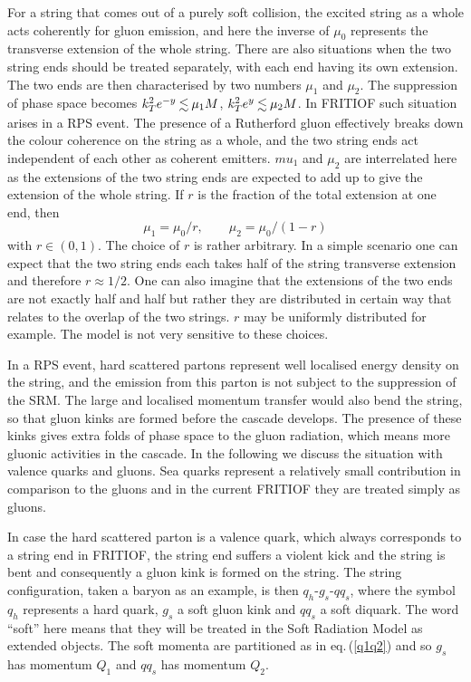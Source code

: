 For a string that comes out of a purely soft
collision, the excited string as a whole acts coherently for
gluon emission, and here the inverse of $\mu_0$ represents the transverse 
extension of the whole string.  There are also situations when the two
string ends should be treated separately, with each end having its own
extension.   The two ends are then 
characterised by two numbers $\mu_1$ and $\mu_2$.  The suppression of
phase space becomes $k^2_Te^{-y}\lsim \mu_1 M$, $k^2_Te^{y}\lsim \mu_2 M$.
In FRITIOF such situation arises in a RPS event.  The presence of a Rutherford
gluon effectively breaks down the colour coherence on the string as a whole, 
and the two string ends act independent of each other as coherent emitters.
$mu_1$ and $\mu_2$ are interrelated here as the extensions of the two string
ends are expected to add up to give the extension of the whole string.
If $r$ is the fraction of the total extension at one end, then 
\begin{equation}
\label{mu12}
\mu_1 = \mu_0/r ,  \qquad \mu_2 = \mu_0/(1-r) 
\end{equation}
with $r \in (0,1)$.  
The choice of $r$ is rather arbitrary.  
In a simple scenario one can expect that the two string ends each takes half
of the string transverse extension and therefore $r\approx 1/2$.
One can also imagine that the extensions of the two ends are not exactly
half and half but rather they are distributed in certain way that relates
to the overlap of the two strings.  $r$ may be uniformly distributed 
for example.   
The model is not very sensitive to these choices.  

In a RPS event, hard scattered partons represent well localised energy
density on the string, and the emission from this parton is not subject
to the suppression of the SRM.  The large and localised momentum transfer
would also bend the string, so that gluon kinks are formed 
before the cascade develops.   
The presence of these
kinks gives extra folds of phase space to the gluon radiation, which means
more gluonic activities in the cascade.  
In the following we discuss
the situation with valence quarks and gluons.  
Sea quarks represent a relatively
small contribution in comparison to the gluons and in the 
current FRITIOF they are treated simply as gluons. 

In case the hard scattered parton is a valence quark, which always
corresponds to a string end in FRITIOF, the string end
suffers a violent kick and 
the string is
bent and consequently a gluon kink is formed on the string.  The
string configuration, taken a baryon as an example, is then  
$q_h$-$g_s$-$qq_s$, where the symbol $q_h$ represents a hard quark, $g_s$ a soft gluon kink and $qq_s$ a soft diquark.  
The word ``soft'' here means that
they will be treated in the Soft Radiation Model as extended objects.
The soft momenta are partitioned as in eq.\,(\ref{q1q2}) and so
$g_s$ has momentum $Q_1$ and $qq_s$ has momentum $Q_2$.  

